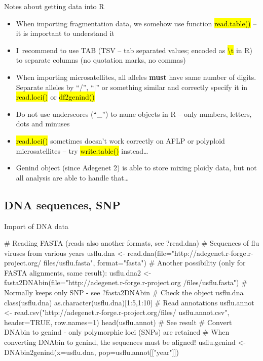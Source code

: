 \documentclass[compress, ucs, xelatex, 11pt, xcolor=svgnames,
  hyperref={
    bookmarks=true,
    unicode=true,
    colorlinks=true,
    pdftitle={Molecular data in R},
    plainpages=false,
    pdfauthor={Vojtech Zeisek},
    pdfsubject={Course about phylogeny and evolution in R},
    pdfcreator={XeLaTeX},
    pdfkeywords={R, evolution, phylogeny, molecular data},
    linkcolor=Tomato,
    anchorcolor=SaddleBrown,
    citecolor=Goldenrod,
    filecolor=DarkMagenta,
    menucolor=Sienna,
    urlcolor=DarkTurquoise,
    pdftex},
  url={hyphens, lowtilde} %
  ]{beamer}
\renewcommand{\texttt}[1]{\hl{\ttfamily #1}}
\begin{document}
\begin{frame}{Notes about getting data into R}
\begin{itemize}
 \item When importing fragmentation data, we somehow use function \texttt{read.table()} -- it is important to understand it
 \item I~recommend to use TAB (TSV -- tab separated values; encoded as \texttt{\textbackslash t} in R) to separate columns (no quotation marks, no commas)
 \item When importing microsatellites, all alleles \textbf{must} have same number of digits. Separate alleles by ``/'', ``|'' or something similar and correctly specify it in \texttt{read.loci()} or \texttt{df2genind()}
 \item Do not use underscores (``\_'') to name objects in R -- only numbers, letters, dots and minuses
 \item \texttt{read.loci()} sometimes doesn't work correctly on AFLP or polyploid microsatellites -- try \texttt{write.table()} instead\ldots
 \item Genind object (since Adegenet 2) is able to store mixing ploidy data, but not all analysis are able to handle that\ldots
\end{itemize}
\end{frame}

\subsection{DNA sequences, SNP}

\begin{frame}[fragile]{Import of DNA data}
  \begin{spluscode}
    # Reading FASTA (reads also another formats, see ?read.dna)
    # Sequences of flu viruses from various years
    usflu.dna <- read.dna(file="http://adegenet.r-forge.r-project.org/
      files/usflu.fasta", format="fasta")
    # Another possibility (only for FASTA alignments, same result):
    usflu.dna2 <- fasta2DNAbin(file="http://adegenet.r-forge.r-project.org
      /files/usflu.fasta") # Normally keeps only SNP - see ?fasta2DNAbin
    # Check the object
    usflu.dna
    class(usflu.dna)
    as.character(usflu.dna)[1:5,1:10]
    # Read annotations
    usflu.annot <- read.csv("http://adegenet.r-forge.r-project.org/files/
      usflu.annot.csv", header=TRUE, row.names=1)
    head(usflu.annot) # See result
    # Convert DNAbin to genind - only polymorphic loci (SNPs) are retained
    # When converting DNAbin to genind, the sequences must be aligned!
    usflu.genind <- DNAbin2genind(x=usflu.dna, pop=usflu.annot[["year"]])
  \end{spluscode}
\end{frame}
\end{document}
